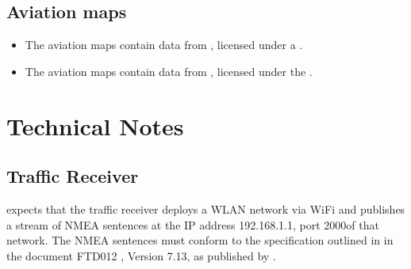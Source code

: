 \documentclass[letterpaper,10pt,english]{sphinxmanual}
\begin{document}
\section{Aviation maps}
\label{\detokenize{04-appendix/licenses:aviation-maps}}\begin{itemize}
\item {} 
\sphinxAtStartPar
The aviation maps contain data from ,
licensed under a .

\item {} 
\sphinxAtStartPar
The aviation maps contain data from , licensed under the .

\end{itemize}


\chapter{Technical Notes}
\label{\detokenize{04-appendix/technical:technical-notes}}\label{\detokenize{04-appendix/technical::doc}}

\section{Traffic Receiver}
\label{\detokenize{04-appendix/technical:traffic-receiver}}
\sphinxAtStartPar
{} expects that the traffic receiver deploys a WLAN
network via Wi\sphinxhyphen{}Fi and publishes a stream of NMEA sentences at the IP address
192.168.1.1, port 2000of that network. The NMEA sentences must conform to the
specification outlined in in the document FTD\sphinxhyphen{}012 , Version 7.13,
as published by .



\renewcommand{\indexname}{Index}
\printindex
\end{document}
